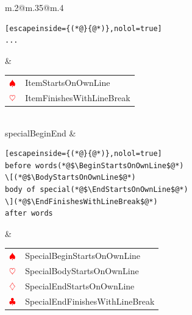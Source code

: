 \begin{longtable}{m{}@{\hspace{.75cm}}m{}@{}m{}}
\begin{lstlisting}[escapeinside={(*@}{@*)},nolol=true]
...
  \end{lstlisting}
		                                       &
		\begin{tabular}[t]{c@{~}l@{}}
			$\color{red}\spadesuit$ & ItemStartsOnOwnLine       \\
			$\color{red}\heartsuit$  & ItemFinishesWithLineBreak \\
		\end{tabular}
		\\
		specialBeginEnd                        &
		\begin{lstlisting}[escapeinside={(*@}{@*)},nolol=true]
before words(*@$\BeginStartsOnOwnLine$@*)
\[(*@$\BodyStartsOnOwnLine$@*)
body of special(*@$\EndStartsOnOwnLine$@*)
\](*@$\EndFinishesWithLineBreak$@*)
after words
  \end{lstlisting}
		                                       &
		\begin{tabular}[t]{c@{~}l@{}}
			$\color{red}\spadesuit$     & SpecialBeginStartsOnOwnLine     \\
			$\color{red}\heartsuit$      & SpecialBodyStartsOnOwnLine      \\
			$\color{red}\diamondsuit$       & SpecialEndStartsOnOwnLine       \\
			$\color{red}\clubsuit$ & SpecialEndFinishesWithLineBreak \\
		\end{tabular}
		\\
		\bottomrule
	\end{longtable}
